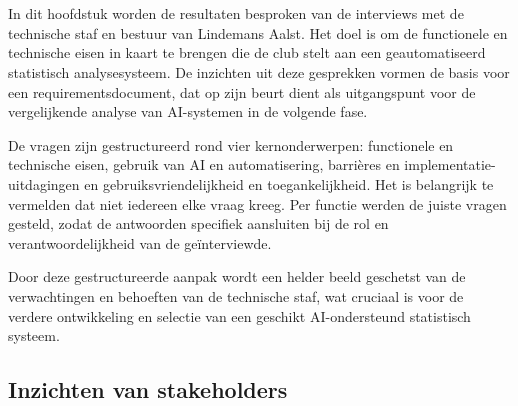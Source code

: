 \chapter{}%
\label{ch:interviews}

In dit hoofdstuk worden de resultaten besproken van de interviews met de technische staf en bestuur van Lindemans Aalst. Het doel is om de functionele en technische eisen in kaart te brengen die de club stelt aan een geautomatiseerd statistisch analysesysteem. De inzichten uit deze gesprekken vormen de basis voor een requirementsdocument, dat op zijn beurt dient als uitgangspunt voor de vergelijkende analyse van AI-systemen in de volgende fase.

De vragen zijn gestructureerd rond vier kernonderwerpen: functionele en technische eisen, gebruik van AI en automatisering, barrières en implementatie-uitdagingen en gebruiksvriendelijkheid en toegankelijkheid. Het is belangrijk te vermelden dat niet iedereen elke vraag kreeg. Per functie werden de juiste vragen gesteld, zodat de antwoorden specifiek aansluiten bij de rol en verantwoordelijkheid van de geïnterviewde.

Door deze gestructureerde aanpak wordt een helder beeld geschetst van de verwachtingen en behoeften van de technische staf, wat cruciaal is voor de verdere ontwikkeling en selectie van een geschikt AI-ondersteund statistisch systeem.

\section{Inzichten van stakeholders}


